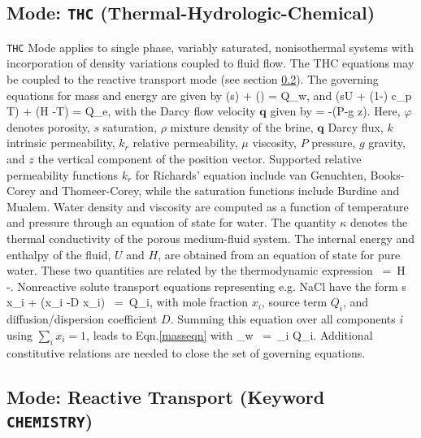\documentclass[12pt]{article}
\def\EQ#1\EN{\begin{equation}#1\end{equation}}
\newcommand{\eq}{\ =\ }
\newcommand{\p}{{\partial}}
\newcommand{\bnabla}{\boldsymbol{\nabla}}
\newcommand{\bq}{\boldsymbol{q}}
\begin{document}
\subsection{Mode: {\tt THC} (Thermal-Hydrologic-Chemical)}

{\tt THC} Mode applies to single phase, variably saturated, nonisothermal systems
with incorporation of density variations coupled to fluid flow. The THC equations may be coupled to the reactive transport mode (see section \ref{sec:chem}).
The governing equations for mass and energy are given by
\EQ\label{masseqn}
\frac{\p}{\p t}\left(\varphi s\rho\right) + \bnabla\cdot\left(\rho\bq\right) = Q_w,
\EN
and
\EQ
\frac{\p}{\p t}\left(\varphi s\rho U + (1-\varphi) c_p T\right) + \bnabla\cdot\left(\rho\bq H -\kappa \bnabla T\right) = Q_e,
\EN
with the Darcy flow velocity $\bq$ given by
\EQ
\bq = -\bnabla\left(P-\rho g z\right).
\EN
Here, $\varphi$ denotes porosity, $s$ saturation, $\rho$ mixture density of the brine, $\bq$ Darcy flux, $k$ intrinsic permeability, $k_r$ relative permeability, $\mu$ viscosity, $P$ pressure, $g$ gravity, and $z$ the vertical component of the position vector.  Supported relative permeability functions $k_r$ for Richards' equation include van Genuchten, Books-Corey and Thomeer-Corey, while the saturation functions include Burdine and Mualem.  Water density and viscosity are computed as a function of temperature and pressure through an equation of state for water. The quantity $\kappa$ denotes the thermal conductivity of the porous medium-fluid system. The internal energy and enthalpy of the fluid, $U$ and $H$, are obtained from an equation of state for pure water. These two quantities are related by the thermodynamic expression
\EQ
U \eq H -.
\EN
Nonreactive solute transport equations representing e.g. NaCl have the form
\EQ
\frac{\p}{\p t} \varphi s \rho x_i + \bnabla\cdot\Big(\bq \rho x_i -\varphi D \rho\bnabla x_i\Big) \eq Q_i,
\EN
with mole fraction $x_i$, source term $Q_i$, and diffusion/dispersion coefficient $D$. Summing this equation over all components $i$ using $\sum_ix_i=1$, leads to Eqn.\eqref{masseqn} with
\EQ
Q_w \eq \sum_i Q_i.
\EN
Additional constitutive relations are needed to close the set of governing equations.

\subsection{Mode: Reactive Transport (Keyword {\tt CHEMISTRY})}\label{sec:chem}
\end{document}
